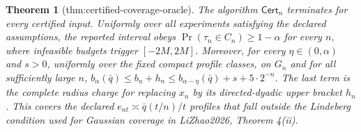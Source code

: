 \documentclass{article}
\newtheorem{theorem}{Theorem}
\begin{document}
\begin{theorem}[thm:certified-coverage-oracle]\label{thm:certified-coverage-oracle}
The algorithm \(\mathsf{Cert}_n\) terminates for every certified input. Uniformly over all experiments satisfying the declared assumptions, the reported interval obeys \(\Pr(\tau_n\in C_n)\ge1-\alpha\) for every \(n\), where infeasible budgets trigger \([-2M,2M]\). Moreover, for every \(\eta\in(0,\alpha)\) and \(s>0\), uniformly over the fixed compact profile classes, on \(G_n\) and for all sufficiently large \(n\), \(b_{\alpha}(\bar q)\le b_n+h_n\le b_{\alpha-\eta}(\bar q)+s+5\cdot2^{-n}\). The last term is the complete radius charge for replacing \(x_n\) by its directed-dyadic upper bracket \(h_n\). This covers the declared \(e_{nt}\asymp\bar q(t/n)/t\) profiles that fall outside the Lindeberg condition used for Gaussian coverage in LiZhao2026, Theorem 4(ii).
\end{theorem}
\end{document}
